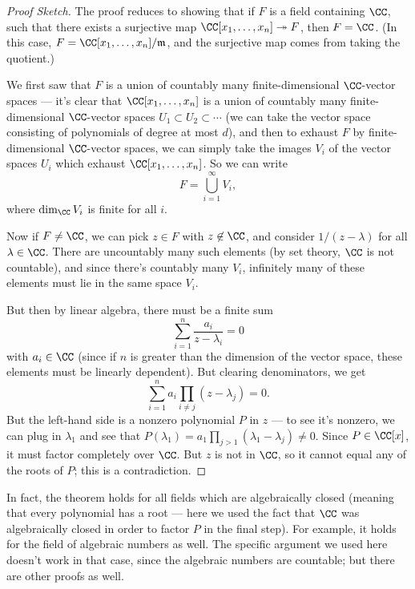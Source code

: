 \begin{proof}[Proof Sketch]
The proof reduces to showing that if $F$ is a field containing $\CC$, such that there exists a surjective map $\CC[x_1, \ldots, x_n] \twoheadrightarrow F$, then $F = \CC$. (In this case, $F = \CC[x_1, \ldots, x_n]/\mathfrak{m}$, and the surjective map comes from taking the quotient.)

We first saw that $F$ is a union of countably many finite-dimensional $\CC$-vector spaces --- it's clear that $\CC[x_1, \ldots, x_n]$ is a union of countably many finite-dimensional $\CC$-vector spaces $U_1 \subset U_2 \subset \cdots$ (we can take the vector space consisting of polynomials of degree at most $d$), and then to exhaust $F$ by finite-dimensional $\CC$-vector spaces, we can simply take the images $V_i$ of the vector spaces $U_i$ which exhaust $\CC[x_1, \ldots, x_n]$. So we can write \[F = \bigcup_{i = 1}^\infty V_i,\] where $\dim_{\CC} V_i$ is finite for all $i$. 

Now if $F \neq \CC$, we can pick $z \in F$ with $z \not\in \CC$, and consider $1/(z - \lambda)$ for all $\lambda \in \CC$. There are uncountably many such elements (by set theory, $\CC$ is not countable), and since there's countably many $V_i$, infinitely many of these elements must lie in the same space $V_i$.

But then by linear algebra, there must be a finite sum \[\sum_{i = 1}^n \frac{a_i}{z - \lambda_i} = 0\] with $a_i \in \CC$ (since if $n$ is greater than the dimension of the vector space, these elements must be linearly dependent). But clearing denominators, we get \[\sum_{i = 1}^n a_i\prod_{i \neq j} (z - \lambda_j) = 0.\] But the left-hand side is a nonzero polynomial $P$ in $z$ --- to see it's nonzero, we can plug in $\lambda_1$ and see that $P(\lambda_1) = a_1\prod_{j > 1}(\lambda_1 - \lambda_j) \neq 0$. Since $P \in \CC[x]$, it must factor completely over $\CC$. But $z$ is not in $\CC$, so it cannot equal any of the roots of $P$; this is a contradiction. 
\end{proof}

\begin{note}
In fact, the theorem holds for all fields which are algebraically closed (meaning that every polynomial has a root --- here we used the fact that $\CC$ was algebraically closed in order to factor $P$ in the final step). For example, it holds for the field of algebraic numbers as well. The specific argument we used here doesn't work in that case, since the algebraic numbers are countable; but there are other proofs as well. 
\end{note}

